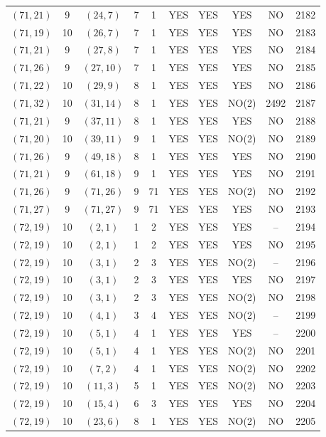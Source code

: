 \begin{longtable}{|c|c|c|c|c|c|c|c|c|c|}
$(71, 21)$ & 9 & $(24, 7)$ & 7 & 1 & YES & YES & YES & NO & 2182\\
$(71, 19)$ & 10 & $(26, 7)$ & 7 & 1 & YES & YES & YES & NO & 2183\\
$(71, 21)$ & 9 & $(27, 8)$ & 7 & 1 & YES & YES & YES & NO & 2184\\
$(71, 26)$ & 9 & $(27, 10)$ & 7 & 1 & YES & YES & YES & NO & 2185\\
$(71, 22)$ & 10 & $(29, 9)$ & 8 & 1 & YES & YES & YES & NO & 2186\\
$(71, 32)$ & 10 & $(31, 14)$ & 8 & 1 & YES & YES & NO(2) & 2492 & 2187\\
$(71, 21)$ & 9 & $(37, 11)$ & 8 & 1 & YES & YES & YES & NO & 2188\\
$(71, 20)$ & 10 & $(39, 11)$ & 9 & 1 & YES & YES & NO(2) & NO & 2189\\
$(71, 26)$ & 9 & $(49, 18)$ & 8 & 1 & YES & YES & YES & NO & 2190\\
$(71, 21)$ & 9 & $(61, 18)$ & 9 & 1 & YES & YES & YES & NO & 2191\\
$(71, 26)$ & 9 & $(71, 26)$ & 9 & 71 & YES & YES & NO(2) & NO & 2192\\
$(71, 27)$ & 9 & $(71, 27)$ & 9 & 71 & YES & YES & YES & NO & 2193\\
$(72, 19)$ & 10 & $(2, 1)$ & 1 & 2 & YES & YES & YES & -- & 2194\\
$(72, 19)$ & 10 & $(2, 1)$ & 1 & 2 & YES & YES & YES & NO & 2195\\
$(72, 19)$ & 10 & $(3, 1)$ & 2 & 3 & YES & YES & NO(2) & -- & 2196\\
$(72, 19)$ & 10 & $(3, 1)$ & 2 & 3 & YES & YES & YES & NO & 2197\\
$(72, 19)$ & 10 & $(3, 1)$ & 2 & 3 & YES & YES & NO(2) & NO & 2198\\
$(72, 19)$ & 10 & $(4, 1)$ & 3 & 4 & YES & YES & NO(2) & -- & 2199\\
$(72, 19)$ & 10 & $(5, 1)$ & 4 & 1 & YES & YES & YES & -- & 2200\\
$(72, 19)$ & 10 & $(5, 1)$ & 4 & 1 & YES & YES & NO(2) & NO & 2201\\
$(72, 19)$ & 10 & $(7, 2)$ & 4 & 1 & YES & YES & NO(2) & NO & 2202\\
$(72, 19)$ & 10 & $(11, 3)$ & 5 & 1 & YES & YES & NO(2) & NO & 2203\\
$(72, 19)$ & 10 & $(15, 4)$ & 6 & 3 & YES & YES & YES & NO & 2204\\
$(72, 19)$ & 10 & $(23, 6)$ & 8 & 1 & YES & YES & NO(2) & NO & 2205\\

\end{longtable}
